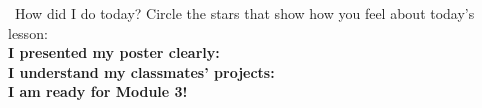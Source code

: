 \vspace{2em}
\begin{center}
\end{center}

\vspace{1em}
\begin{grammartip}{ \ How did I do today?}
  Circle the stars that show how you feel about today's lesson:\\[6pt]
  \textbf{I presented my poster clearly:} \selfcheck[0] \\[4pt]
  \textbf{I understand my classmates' projects:} \selfcheck[0] \\[4pt]
  \textbf{I am ready for Module 3!} \selfcheck[0]
\end{grammartip}
